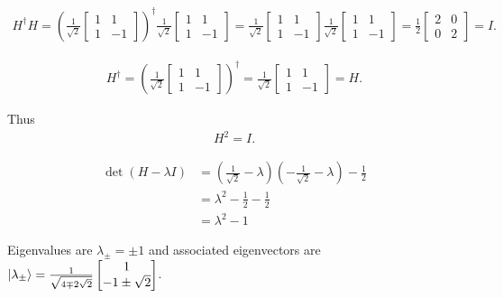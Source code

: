 \begin{align*}
	H^\dagger H = \left(\frac{1}{\sqrt{2}} \begin{bmatrix}
	1 & 1 \\ 
	1 & -1
	\end{bmatrix}\right)^\dagger
	\frac{1}{\sqrt{2}} \begin{bmatrix}
	1 & 1 \\ 
	1 & -1
	\end{bmatrix}
	=
	\frac{1}{\sqrt{2}} \begin{bmatrix}
	1 & 1 \\ 
	1 & -1
	\end{bmatrix}
	\frac{1}{\sqrt{2}} \begin{bmatrix}
	1 & 1 \\ 
	1 & -1
	\end{bmatrix}
	=
	\frac{1}{2} \begin{bmatrix}
	2 & 0 \\ 
	0 & 2
	\end{bmatrix}
	=
	I.
\end{align*}



\begin{align*}
	H^\dagger = \left(\frac{1}{\sqrt{2}} \begin{bmatrix}
	1 & 1 \\ 
	1 & -1
	\end{bmatrix}\right)^\dagger
	=
	\frac{1}{\sqrt{2}} \begin{bmatrix}
	1 & 1 \\ 
	1 & -1
	\end{bmatrix}
	=
	H.
\end{align*}

Thus
\begin{align*}
	H^2 = I.
\end{align*}




\begin{align*}
	\det \left(H - \lambda I\right) &= \left(\frac{1}{\sqrt{2}} - \lambda \right) \left(- \frac{1}{\sqrt{2}} - \lambda \right) - \frac{1}{2}\\
		&= \lambda^2 - \frac{1}{2} - \frac{1}{2}\\
		&= \lambda^2 - 1
\end{align*}

Eigenvalues are $\lambda_\pm = \pm 1$ and associated eigenvectors are $\ket{\lambda_\pm} = \frac{1}{\sqrt{4 \mp 2 \sqrt{2}}} \begin{bmatrix}
1 \\ 
-1 \pm \sqrt{2}
\end{bmatrix} $.



